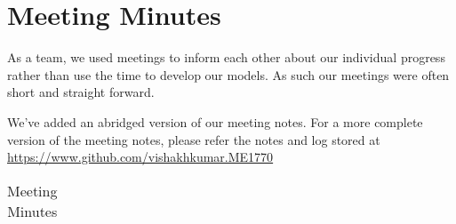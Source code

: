 

\chapter{Meeting Minutes}
As a team, we used meetings to inform each other about our individual progress rather than use the time to develop our models.
As such our meetings were often short and straight forward.

We've added an abridged version of our meeting notes. For a more complete version of the meeting notes, please refer the notes and log stored at \url{https://www.github.com/vishakhkumar.ME1770}

\begin{table}[t]
\caption{Meeting Minutes}
\begin{center}
\begin{tabularx}{\textwidth}{|L|L|L|}


\end{tabularx}
\end{center}
\end{table}
